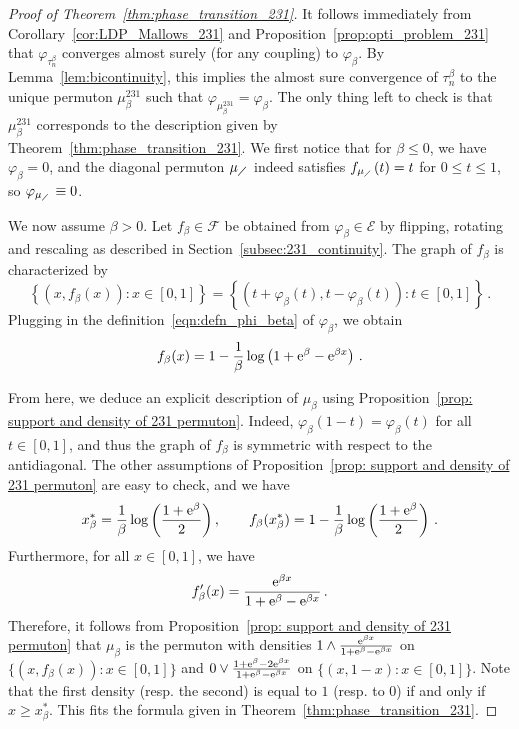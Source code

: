 \documentclass[a4paper,11pt]{amsart}
\newcommand{\ee}{\textup{e}}
\theoremstyle{definition}
\begin{document}
\begin{proof}[Proof of Theorem~\ref{thm:phase_transition_231}]
	It follows immediately from Corollary~\ref{cor:LDP_Mallows_231} and Proposition~\ref{prop:opti_problem_231} that $\varphi_{\tau_n^{\beta}}$ converges almost surely (for any coupling) to $\varphi_{\beta}$. 
    By Lemma~\ref{lem:bicontinuity}, this implies the almost sure convergence of $\tau_n^{\beta}$ to the unique permuton $\mu_{\beta}^{231}$ such that $\varphi_{\mu_{\beta}^{231}}=\varphi_{\beta}$. 
    The only thing left to check is that $\mu_{\beta}^{231}$ corresponds to the description given by Theorem~\ref{thm:phase_transition_231}. 
    We first notice that for $\beta \leq 0$, we have $\varphi_{\beta}=0$, and the diagonal permuton $\mu_{\diagup}$ indeed satisfies $f_{\mu_{\diagup}}(t)=t$ for $0 \leq t \leq 1$, so $\varphi_{\mu_{\diagup}} \equiv 0$.
	
	We now assume $\beta>0$. Let $f_\beta\in\mathcal F$ be obtained from $\varphi_\beta\in\mathcal E$ by flipping, rotating and rescaling as described in Section~\ref{subsec:231_continuity}. The graph of $f_\beta$ is characterized by
	\[
	\left\{ (x,f_\beta(x)) : x\in[0,1] \right\}
	= \left\{ (t+\varphi_\beta(t), t-\varphi_\beta(t)) : t\in[0,1] \right\} \, .
	\]
	Plugging in the definition~\eqref{eqn:defn_phi_beta} of $\varphi_{\beta}$, we obtain
	\[ f_\beta(x)= 1 - \frac{1}{\beta} \log\left( 1 + \ee^\beta - \ee^{\beta x} \right) \, . \]
	
	From here, we deduce an explicit description of $\mu_\beta$ using Proposition~\ref{prop: support and density of 231 permuton}. Indeed, $\varphi_\beta(1-t) = \varphi_\beta(t)$ for all $t\in[0,1]$, and thus the graph of $f_\beta$ is symmetric with respect to the antidiagonal.
	The other assumptions of Proposition~\ref{prop: support and density of 231 permuton} are easy to check, and we have 
	\[
	x_\beta^* = \frac1\beta \log\left( \frac{1+\ee^\beta}{2} \right),\quad \quad
	f_\beta(x_\beta^*) = 1 - \frac1\beta \log\left( \frac{1+\ee^\beta}{2} \right) \,.
	\]
	Furthermore, for all $x \in [0,1]$, we have
	\[
		f_\beta'(x) = \frac{\ee^{\beta x}}{1 + \ee^\beta - \ee^{\beta x}} \,.
	\]
	Therefore, it follows from Proposition~\ref{prop: support and density of 231 permuton} that $\mu_\beta$ is the permuton with densities $1 \wedge \frac{\ee^{\beta x}}{1 + \ee^\beta - \ee^{\beta x}}$ on $\{ (x,f_\beta(x)) : x\in[0,1] \}$ and $0 \vee \frac{1 + \ee^\beta - 2\ee^{\beta x}}{1 + \ee^\beta - \ee^{\beta x}}$ on $\{ (x,1-x) : x\in[0,1] \}$. 
    Note that the first density (resp. the second) is equal to $1$ (resp. to $0$) if and only if $x\ge x_\beta^*$. This fits the formula given in Theorem~\ref{thm:phase_transition_231}.
\end{proof}
\end{document}
